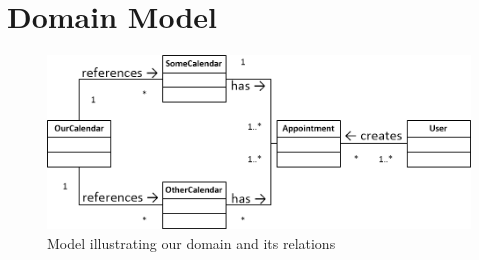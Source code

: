 \section{Domain Model}
\begin{figure}[h!]
  \includegraphics[width=\textwidth,natwidth=482,natheight=198]{illustrations/DomainModel.png}
  \caption{Model illustrating our domain and its relations}
\end{figure}
\newpage

